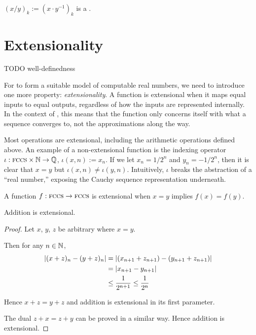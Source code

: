 \documentclass[leqno]{report}
\begin{document}
\begin{Corollary}[Division]
    $(x/y)_k := \left(x \cdot y^{-1}\right)_k$ is a \FCCS.
\end{Corollary}

\section{Extensionality}

TODO well-definedness

For \FCCS{} to form a suitable model of computable real numbers, we need to introduce one more property: \textit{extensionality}. A function is extensional when it maps equal inputs to equal outputs, regardless of how the inputs are represented internally. In the context of \FCCS, this means that the function only concerns itself with what a sequence converges to, not the approximations along the way.

Most operations are extensional, including the arithmetic operations defined above. An example of a non-extensional function is the indexing operator $\iota : \textsc{fccs} \times \mathbb{N} \rightarrow \mathbb{Q}$, $\iota(x, n) := x_n$. If we let $x_n = 1/2^n$ and $y_n = -1/2^n$, then it is clear that $x = y$ but $\iota(x, n) \neq \iota(y, n)$. Intuitively, $\iota$ breaks the abstraction of a ``real number,'' exposing the Cauchy sequence representation underneath.

\begin{Definition}[Extensionality]
    A function $f : \textsc{fccs} \rightarrow \textsc{fccs}$ is extensional when $x = y$ implies $f(x) = f(y)$.
\end{Definition}

\begin{Proposition}
    Addition is extensional.
\end{Proposition}

\begin{proof}
    Let $x$, $y$, $z$ be arbitrary \FCCS{} where $x = y$.

    Then for any $n \in \mathbb{N}$,
    \begin{align*}
        \left|  (x + z)_n - (y + z)_n  \right|
        &= \left|  (x_{n+1} + z_{n+1}) - (y_{n+1} + z_{n+1})  \right| \\
        &= \left|  x_{n+1} - y_{n+1}  \right| \\
        &\leq \frac{1}{2^{n+1}} \leq \frac{1}{2^n}
    \end{align*}

    Hence $x + z = y + z$ and addition is extensional in its first parameter.

    The dual $z + x = z + y$ can be proved in a similar way. Hence addition is extensional.
\end{proof}
\end{document}

